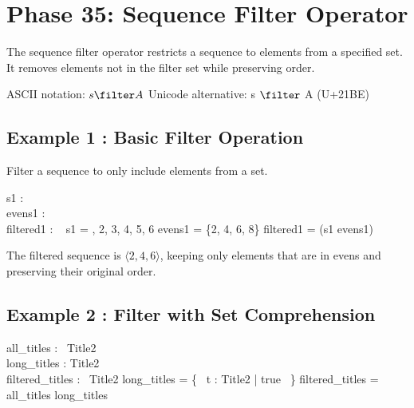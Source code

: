 \documentclass[a4paper,10pt,fleqn]{article}
\begin{document}
\section*{Phase 35: Sequence Filter Operator}

\noindent The sequence filter operator restricts a sequence to elements from a specified set. It removes elements not in the filter set while preserving order.

\bigskip

\noindent ASCII notation: $s \filter A$ Unicode alternative: s $\filter$ A (U+21BE)

\bigskip

\subsection*{Example 1 : Basic Filter Operation}

\noindent Filter a sequence to only include elements from a set.

\bigskip

\begin{axdef}
s1 : \seq~\nat \\
evens1 : \power \nat \\
filtered1 : \seq~\nat
\where
s1 = , 2, 3, 4, 5, 6 \rangle \land evens1 = \{2, 4, 6, 8\} \land filtered1 = (s1 \filter evens1)
\end{axdef}

\noindent The filtered sequence is $\langle 2, 4, 6 \rangle$, keeping only elements that are in evens and preserving their original order.

\bigskip

\subsection*{Example 2 : Filter with Set Comprehension}

\begin{zed}
\end{zed}

\begin{axdef}
all\_titles : \seq~Title2 \\
long\_titles : \power Title2 \\
filtered\_titles : \seq~Title2
\where
long\_titles = \{~ t : Title2 | true ~\} \land filtered\_titles = all\_titles \filter long\_titles
\end{axdef}
\end{document}
